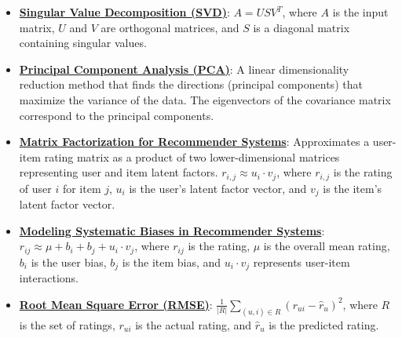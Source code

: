 \documentclass{article}%
\begin{document}
\begin{itemize}[leftmargin=*]%
\item \href{https://www.math.purdue.edu/~yipn/351/11L2-svd-pca-recommender.pdf#page=10}{\textbf{Singular Value Decomposition (SVD)}}: $A = USV^T$, where $A$ is the input matrix, $U$ and $V$ are orthogonal matrices, and $S$ is a diagonal matrix containing singular values.%
\item \href{https://www.math.purdue.edu/~yipn/351/11L2-svd-pca-recommender.pdf#page=17}{\textbf{Principal Component Analysis (PCA)}}: A linear dimensionality reduction method that finds the directions (principal components) that maximize the variance of the data. The eigenvectors of the covariance matrix correspond to the principal components.%
\item \href{https://www.math.purdue.edu/~yipn/351/11L2-svd-pca-recommender.pdf#page=36}{\textbf{Matrix Factorization for Recommender Systems}}: Approximates a user-item rating matrix as a product of two lower-dimensional matrices representing user and item latent factors. $r_{i,j} \approx u_i \cdot v_j$, where $r_{i,j}$ is the rating of user $i$ for item $j$, $u_i$ is the user's latent factor vector, and $v_j$ is the item's latent factor vector.%
\item \href{https://www.math.purdue.edu/~yipn/351/11L2-svd-pca-recommender.pdf#page=44}{\textbf{Modeling Systematic Biases in Recommender Systems}}: $r_{ij} \approx \mu + b_i + b_j + u_i \cdot v_j$, where $r_{ij}$ is the rating, $\mu$ is the overall mean rating, $b_i$ is the user bias, $b_j$ is the item bias, and $u_i \cdot v_j$ represents user-item interactions.%
\item \href{https://www.math.purdue.edu/~yipn/351/11L2-svd-pca-recommender.pdf#page=49}{\textbf{Root Mean Square Error (RMSE)}}: $\frac{1}{|R|} \sum_{(u,i) \in R} (r_{ui} - \hat{r}_u)^2$, where $R$ is the set of ratings, $r_{ui}$ is the actual rating, and $\hat{r}_u$ is the predicted rating.%
\end{itemize}%
\end{document}
